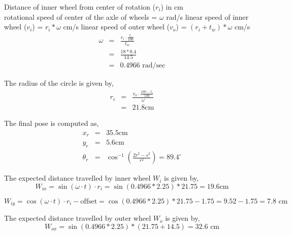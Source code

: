 Distance of inner wheel from center of rotation ($r_i$) in cm \\ 
rotational speed of center of the axle of wheels = $\omega$ rad/s \newline
linear speed of inner wheel ($v_i$) = $r_i * \omega$ cm/s \newline
linear speed of outer wheel ($v_o$) = $(r_i + t_w ) * \omega$ cm/s \newline
\begin{equation}
\begin{array}{rcl}
\omega &=& \frac{r_i \cdot \frac{t_r}{100}}{t_w} \\
 &=& \frac{18 * 0.4}{14.5} \\
 &=& 0.4966 \text{ rad/sec}
\end{array}
\end{equation}

The radius of the circle is given by,
\begin{equation}
\begin{array}{rcl}
r_i &=& \frac{v_o \cdot \frac{100 - t_r}{100}}{\omega} \\
&=& 21.8 \text{cm}
\end{array}
\end{equation}

The final pose is computed as,
\begin{equation}
\begin{array}{rcl}
x_r &=& 35.5 \text{cm} \\
y_r &=& 5.6 \text{cm} \\
\theta_r &=& \cos^{-1}\left(\frac{2r^2 - s^2}{r^2}\right) = 89.4^{\circ}
\end{array}
\end{equation}

The expected distance travelled by inner wheel $W_i$ is given by,
\begin{equation}
W_{ix} = \sin(\omega \cdot t) \cdot r_i = \sin(0.4966 * 2.25) * 21.75 = 19.6 \text{cm}
\end{equation}

\begin{equation}
W_{iy} = \cos(\omega \cdot t) \cdot r_i - \text{offset} =  \cos(0.4966 * 2.25) * 21.75 - 1.75 = 9.52 - 1.75 = 7.8 \text{ cm}
\end{equation}

The expected distance travelled by outer wheel $W_o$ is given by,
\begin{equation}
W_{ox} = \sin(0.4966 * 2.25) * (21.75 + 14.5) = 32.6 \text{ cm}
\end{equation}

